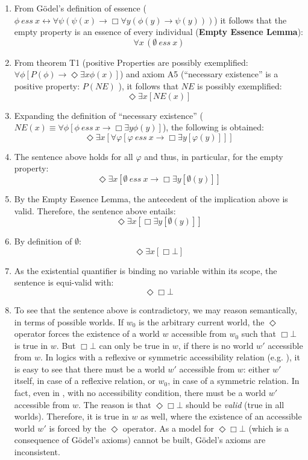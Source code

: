 \documentclass{article}
\newcommand{\imp}{\rightarrow}
\newcommand{\biimp}{\leftrightarrow}
\newcommand{\allq}{\forall}
\newcommand{\exq}{\exists}
\newcommand{\Dia}{\Diamond} %
\newcommand{\NE}{\mathit{NE}}
\newcommand{\ess}[2]{#1\ \mathit{ess}\ #2}
\newcommand{\nec}{\Box}
\newcommand{\pos}{\Dia}
\begin{document}
\begin{enumerate}
\item From G\"odel's definition of essence 
(${\ess{\phi}{x} \biimp {\allq \psi} (\psi(x)
\imp {\nec} \allq y (\phi(y) \imp \psi(y)))}$) it follows that the empty property is an essence of every individual (\textbf{Empty Essence Lemma}): 
$$\allq x\,(\ess{\emptyset}{x})$$

\item From theorem T1 (positive Properties are possibly
  exemplified: ${\allq \phi} [P(\phi) \imp {\pos}  \exq x
  \phi(x)]$) and axiom A5 (``necessary existence'' is a positive property: $P(\NE)$ ), it follows that $\NE$ is possibly exemplified:
  $$
  \pos \exq x [\NE(x)]
  $$
 
\item Expanding the definition of ``necessary existence'' ( 
  ${\NE(x) \equiv \allq
  \phi [\ess{\phi}{x} \imp \nec
  \exq y \phi(y)]}$), the following is obtained:
  $$
  \pos \exq x [\allq \varphi [ \ess{\varphi}{x} \imp \nec \exq y [\varphi(y)] ] ]
  $$

\item The sentence above holds for all $\varphi$ and thus, in particular, for the empty property:
$$
\pos \exq x [ \ess{\emptyset}{x} \imp \nec \exq y [\emptyset(y)] ]
$$

\item By the Empty Essence Lemma, the antecedent of the implication above is valid. Therefore, the sentence above entails:
$$
\pos \exq x [ \nec \exq y [\emptyset(y)] ]
$$ 

\item By definition of $\emptyset$: 
$$
\pos \exq x [ \nec \bot ]
$$

\item As the existential quantifier is binding no variable within its scope, the sentence is equi-valid with:
$$\pos \nec \bot $$

\item To see that the sentence above is contradictory, we may reason semantically, in terms of possible worlds. If $w_0$ is the arbitrary current world, the $\pos$ operator forces the existence of a world $w$ accessible from $w_0$ such that $\nec \bot$ is true in $w$. But $\nec \bot$ can only be true in $w$, if there is no world $w'$ accessible from $w$. In logics with a reflexive or symmetric accessibility relation (e.g. \KB), it is easy to see that there must be a world $w'$ accessible from $w$: either $w'$ itself, in case of a reflexive relation, or $w_0$, in case of a symmetric relation. In fact, even in \K, with no accessibility condition, there must be a world $w'$ accessible from $w$. The reason is that $\pos \nec \bot$ should be \emph{valid} (true in all worlds). Therefore, it is true in $w$ as well, where the existence of an accessible world $w'$ is forced by the $\pos$ operator. As a model for $\pos \nec \bot$ (which is a consequence of G\"odel's axioms) cannot be built, G\"odel's axioms are inconsistent.
\end{enumerate}
\end{document}
